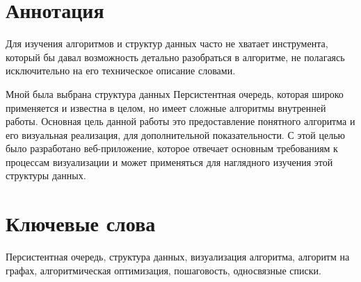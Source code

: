 \documentclass[a4paper,12pt]{extarticle}
\begin{document}
\newpage
\setcounter{page}{2}

{
	\hypersetup{linkcolor=black}
	\tableofcontents
}

\newpage

\newpage
\section*{Аннотация}
Для изучения алгоритмов и структур данных часто не хватает инструмента, который бы давал возможность детально разобраться в алгоритме, не полагаясь исключительно на его техническое описание словами.\par
Мной была выбрана структура данных Персистентная очередь, которая широко применяется и известна в целом, но имеет сложные алгоритмы внутренней работы. Основная цель данной работы это предоставление понятного алгоритма и его визуальная реализация, для дополнительной показательности. С этой целью было разработано веб-приложение, которое отвечает основным требованиям к процессам визуализации и может применяться для наглядного изучения этой структуры данных.


\section*{Ключевые слова}
Персистентная очередь, структура данных, визуализация алгоритма, алгоритм на графах, алгоритмическая оптимизация, пошаговость, односвязные списки.
\pagebreak
\end{document}

